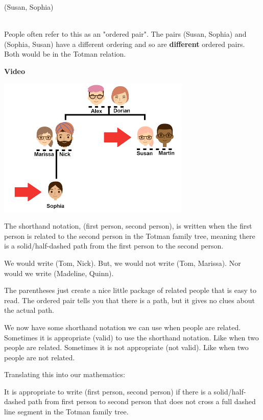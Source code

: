 \documentclass{ximera}
\begin{document}
\begin{notation}
\begin{center}
(Susan, Sophia) 
\end{center}
\end{notation}
\quad \\


People often refer to this as an "ordered pair".  The pairs (Susan, Sophia) and (Sophia, Susan) have a different ordering and so are \textbf{different} ordered pairs. Both would be in the Totman relation.

\begin{explanation} \textbf{Video}
\begin{center}
\includegraphics{pics/Sophia_Susan.png}
\end{center}
 \end{explanation}
 
The shorthand notation, (first person, second person), is written when the first person is related to the second person in the Totman family tree, meaning there is a solid/half-dashed path from the first person to the second person.

We would write (Tom, Nick). But, we would not write (Tom, Marissa).  Nor would we write (Madeline, Quinn).  

The parentheses just create a nice little package of related people that is easy to read. The ordered pair tells you that there is a path, but it gives no clues about the actual path.

We now have some shorthand notation we can use when people are related. Sometimes it is appropriate (valid) to use the shorthand notation.  Like when two people are related.  Sometimes it is not appropriate (not valid).  Like when two people are not related.

Translating this into our mathematics: 

\begin{explanation}
It is appropriate to write (first person, second person) if there is a solid/half-dashed path from first person to second person that does not cross a full dashed line segment in the Totman family tree. 
\end{explanation}
\quad \\
\end{document}
